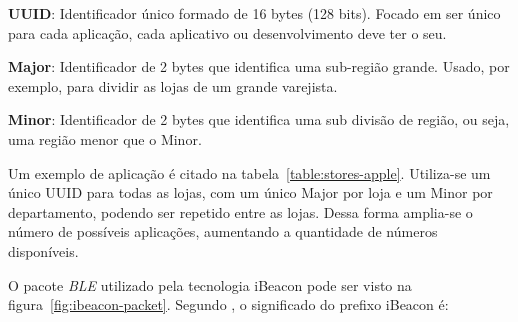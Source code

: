 \documentclass[
	12pt,				%
	openright,			%
	oneside,			%
	a4paper,			%
	chapter=TITLE,		%
	english,			%
	brazil				%
	]{abntex2}
\begin{document}
{\begin{alineas}
	\item \textbf{UUID}: Identificador único formado de 16 bytes (128 bits). Focado em ser único para cada aplicação, cada aplicativo ou desenvolvimento deve ter o seu.
	\item \textbf{Major}: Identificador de 2 bytes que identifica uma sub-região grande. Usado, por exemplo, para dividir as lojas de um grande varejista.
	\item \textbf{Minor}: Identificador de 2 bytes que identifica uma sub divisão de região, ou seja, uma região menor que o Minor.
\end{alineas}

Um exemplo de aplicação é citado na tabela~\ref{table:stores-apple}. Utiliza-se um único UUID para todas as lojas, com um único Major por loja e um Minor por departamento, podendo ser repetido entre as lojas. Dessa forma amplia-se o número de possíveis aplicações, aumentando a quantidade de números disponíveis.

\begin{table}[htb]
\end{table}

O pacote \textit{BLE} utilizado pela tecnologia iBeacon pode ser visto na figura~\ref{fig:ibeacon-packet}. Segundo , o significado do prefixo iBeacon é:

}
\end{document}
